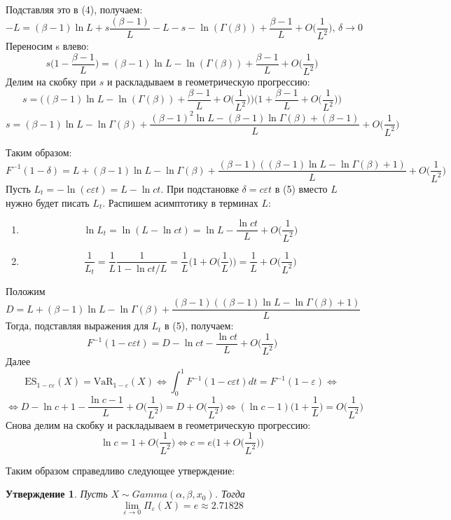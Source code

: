 \documentclass[12pt]{article}
\theoremstyle{plain}
\newtheorem{state}{Утверждение}[section]
\theoremstyle{definition}
\theoremstyle{remark}
\begin{document}
Подставляя это в (4), получаем:
\[
    -L = (\beta-1)\ln L + s\frac{(\beta-1)}{L}-L-s - \ln(\Gamma(\beta)) +\frac{\beta-1}{L} + O\bigg(\frac{1}{L^2}\bigg)\text{, } \delta \to 0
\]
Переносим s влево:
\[
    s\bigg(1-\frac{\beta-1}{L}\bigg)= (\beta-1)\ln L - \ln(\Gamma(\beta)) +\frac{\beta-1}{L} + O\bigg(\frac{1}{L^2}\bigg)
\]
Делим на скобку при $s$ и раскладываем в геометрическую прогрессию:
\[
   s =  \bigg((\beta-1)\ln L - \ln(\Gamma(\beta)) +\frac{\beta-1}{L} + O\bigg(\frac{1}{L^2}\bigg)\bigg)\bigg(1+\frac{\beta-1}{L} + O\bigg(\frac{1}{L^2}\bigg)\bigg)
\]
\[
    s = (\beta-1)\ln L -\ln\Gamma(\beta) + \frac{(\beta-1)^2\ln L -(\beta - 1)\ln\Gamma(\beta)+(\beta-1)}{L} + O\bigg(\frac{1}{L^2}\bigg)
\]

Таким образом:
\begin{equation}
    F^{-1}(1-\delta) = L + (\beta-1)\ln L -\ln\Gamma(\beta) + \frac{(\beta-1)((\beta-1)\ln L -\ln\Gamma(\beta)+1)}{L} + O\bigg(\frac{1}{L^2}\bigg)
\end{equation}
Пусть $L_t = -\ln(c\varepsilon t) = L - \ln ct$. При подстановке  $\delta = c\varepsilon t$ в (5) вместо $L$ нужно будет писать $L_t$. Распишем асимптотику в терминах $L$:
\begin{enumerate}
    \item 
    \[
        \ln L_t = \ln(L-\ln ct)= \ln L - \frac{\ln ct}{L} + O\bigg(\frac{1}{L^2}\bigg)
    \]
    \item 
    \[
        \frac{1}{L_t} = \frac{1}{L}\frac{1}{1-\ln ct/L} = \frac{1}{L}\bigg(1+O\bigg(\frac{1}{L}\bigg)\bigg) = \frac{1}{L}+O\bigg(\frac{1}{L^2}\bigg)
    \]
\end{enumerate}
Положим \[
D = L + (\beta-1)\ln L - \ln\Gamma(\beta) + \frac{(\beta-1)((\beta-1)\ln L -\ln\Gamma(\beta)+1)}{L}
\]
Тогда, подставляя выражения для $L_t$ в (5), получаем:
\[
F^{-1}(1 - c\varepsilon t) = D - \ln ct - \frac{\ln ct}{L} + O\bigg(\frac{1}{L^2}\bigg)
\]
Далее
\[
\text{ES}_{1-c\varepsilon}(X)=\text{VaR}_{1-\varepsilon}(X) \iff \int_0^1F^{-1}(1-c\varepsilon t)dt = F^{-1}(1-\varepsilon) \iff
\]
\[
    \iff D - \ln c + 1 - \frac{\ln c - 1}{L} + O\bigg(\frac{1}{L^2}\bigg)=D + O\bigg(\frac{1}{L^2}\bigg) \iff (\ln c - 1)\bigg(1+\frac{1}{L}\bigg)=O\bigg(\frac{1}{L^2}\bigg)
\]
Снова делим на скобку и раскладываем в геометрическую прогрессию:
\[
    \ln c = 1 + O\bigg(\frac{1}{L^2}\bigg) \iff c = e\bigg(1+O\bigg(\frac{1}{L^2}\bigg)\bigg)
\]

Таким образом справедливо следующее утверждение:
\begin{state}
    Пусть $X \sim Gamma(\alpha, \beta, x_0)$. Тогда 
    \[
        \lim_{\varepsilon \to 0}\Pi_\varepsilon(X) = e \approx 2.71828
    \]
\end{state}
\end{document}
